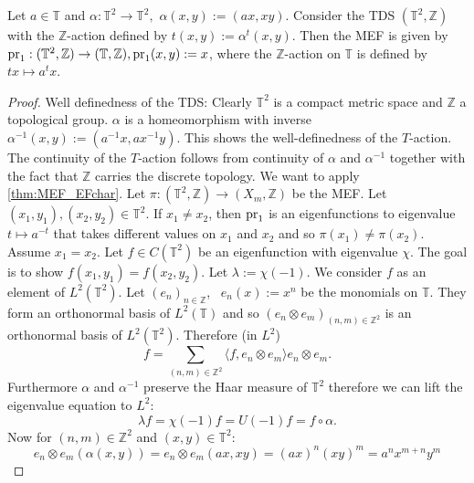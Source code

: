 \begin{proposition}
Let $a \in \mathbb{T}$ and $\alpha: \mathbb{T}^2 \to \mathbb{T}^2,$ $\alpha (x,y) := (ax,xy)$.
  Consider the TDS $(\mathbb{T}^2,\mathbb{Z})$ with the $\mathbb{Z}$-action defined by $t (x,y) := \alpha^t (x,y)$.
  Then the MEF is given by $\operatorname{pr}_1 : (\mathbb{T}^2,\mathbb{Z}) \to (\mathbb{T},\mathbb{Z}), \operatorname{pr}_1 (x,y) := x$, where the $\mathbb{Z}$-action on $\mathbb{T}$ is defined by $t x \mapsto a^t x$.
\end{proposition}
\begin{proof}
  Well definedness of the TDS:
  Clearly $\mathbb{T}^2$ is a compact metric space and $\mathbb{Z}$ a topological group.
  $\alpha$ is a homeomorphism with inverse $\alpha^{-1} (x,y):= (a^{-1} x, a x^{-1} y)$.
  This shows the well-definedness of the $T$-action.
  The continuity of the $T$-action follows from continuity of $\alpha$ and $\alpha^{-1}$ together with the fact that $\mathbb{Z}$ carries the discrete topology.
  We want to apply \cref{thm:MEF_EFchar}.
  Let $\pi : (\mathbb{T}^2 , \mathbb{Z}) \to (X_m, \mathbb{Z})$ be the MEF.
  Let $(x_1, y_1), (x_2, y_2) \in \mathbb{T}^2$.
  If $x_1 \neq x_2$, then $\operatorname{pr}_1$ is an eigenfunctions to eigenvalue $t \mapsto a^{-t}$ that takes different values on $x_1$ and $x_2$ and so $\pi(x_1) \neq \pi(x_2)$.
  Assume $x_1 = x_2$.
  Let $f \in C(\mathbb{T}^2)$ be an eigenfunction with eigenvalue $\chi$.
  The goal is to show $f(x_1, y_1) = f(x_2,y_2)$.
  Let $\lambda := \chi (-1)$.
  We consider $f$ as an element of $L^2( \mathbb{T}^2)$.
  Let $(e_n)_{n \in \mathbb{Z}}$, \ $e_n(x):= x^n$ be the monomials on $\mathbb{T}$.
  They form an orthonormal basis of $L^2(\mathbb{T})$ and so $(e_n \otimes e_m)_{(n,m) \in \mathbb{Z}^2}$ is an orthonormal basis of $L^2(\mathbb{T}^2)$.
  Therefore (in $L^2$)
  \begin{equation*}
    f = \sum_{(n,m) \in \mathbb{Z}^2} \langle f, e_n \otimes e_m \rangle e_n \otimes e_m.
  \end{equation*}
  Furthermore $\alpha$ and $\alpha^{-1}$ preserve the Haar measure of $\mathbb{T}^2$ therefore we can lift the eigenvalue equation to $L^2$:
  \begin{equation}
    \label{eq:T2mefEveq}
    \lambda f = \chi(-1) f=  U(-1)f  = f \circ \alpha.
  \end{equation}
  Now for $(n,m) \in \mathbb{Z}^2$ and $(x,y) \in \mathbb{T}^2$:
  \begin{equation*}
    e_n \otimes e_m (\alpha (x,y)) = e_n \otimes e_m (a x, x y) = (ax)^n (xy)^m = a^n x^{m+n} y^m

\end{equation*}
\end{proof}
